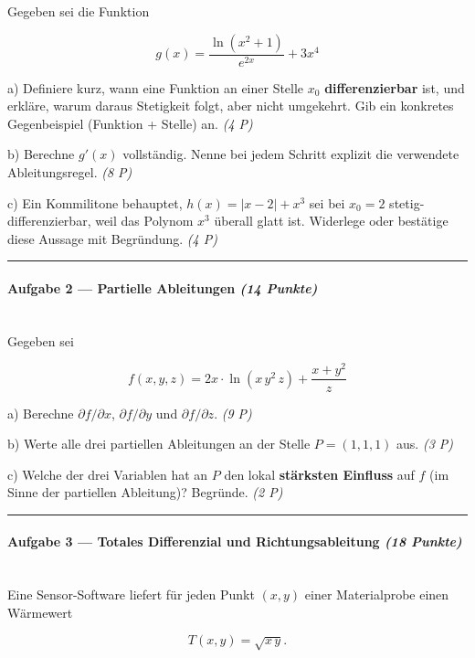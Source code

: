 \documentclass[11pt, a4paper]{article}
\begin{document}
Gegeben sei die Funktion


\[
g(x) = \frac{\ln(x^2+1)}{e^{2x}} + 3x^4
\]


a) Definiere kurz, wann eine Funktion an einer Stelle $x_0$ \textbf{differenzierbar} ist, und erkläre, warum daraus Stetigkeit folgt, aber nicht umgekehrt. Gib ein konkretes Gegenbeispiel (Funktion + Stelle) an. \textit{(4 P)}


b) Berechne $g'(x)$ vollständig. Nenne bei jedem Schritt explizit die verwendete Ableitungsregel. \textit{(8 P)}


c) Ein Kommilitone behauptet, $h(x) = |x-2| + x^3$ sei bei $x_0 = 2$ stetig-differenzierbar, weil das Polynom $x^3$ überall glatt ist. Widerlege oder bestätige diese Aussage mit Begründung. \textit{(4 P)}



\noindent\textcolor{rulegray}{\rule{\linewidth}{0.4pt}}


\paragraph{Aufgabe 2 — Partielle Ableitungen \textit{(14 Punkte)}}\mbox{}\\[2pt]

Gegeben sei


\[
f(x,y,z) = 2x \cdot \ln(x \, y^2 \, z) + \frac{x+y^2}{z}
\]


a) Berechne $\partial f / \partial x$, $\partial f / \partial y$ und $\partial f / \partial z$. \textit{(9 P)}


b) Werte alle drei partiellen Ableitungen an der Stelle $P = (1, 1, 1)$ aus. \textit{(3 P)}


c) Welche der drei Variablen hat an $P$ den lokal \textbf{stärksten Einfluss} auf $f$ (im Sinne der partiellen Ableitung)? Begründe. \textit{(2 P)}



\noindent\textcolor{rulegray}{\rule{\linewidth}{0.4pt}}


\paragraph{Aufgabe 3 — Totales Differenzial und Richtungsableitung \textit{(18 Punkte)}}\mbox{}\\[2pt]

Eine Sensor-Software liefert für jeden Punkt $(x,y)$ einer Materialprobe einen Wärmewert


\[
T(x,y) = \sqrt{x \, y}.
\]
\end{document}
